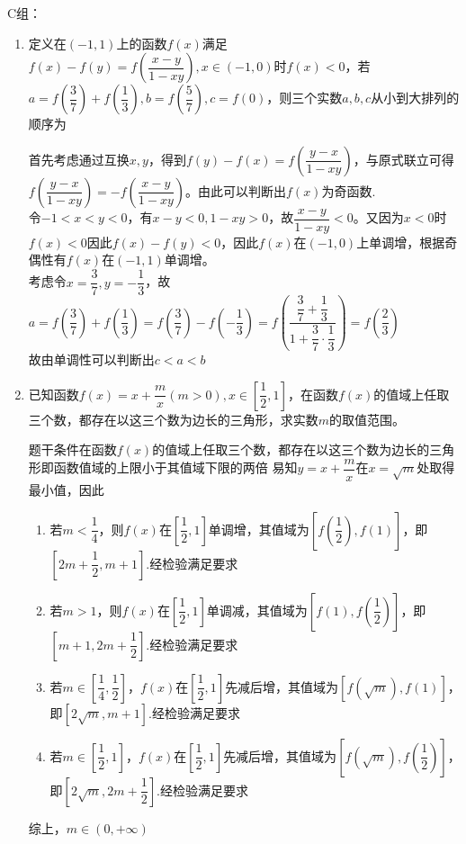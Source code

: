 C组：
\begin{enumerate}
    \item 定义在$(-1, 1)$上的函数$f(x)$满足$f(x) - f(y) = f(\dfrac{x-y}{1-xy}), x \in (-1, 0)$时$f(x) < 0$，若$a = f(\dfrac{3}{7}) + f(\dfrac{1}{3}), b = f(\dfrac{5}{7}), c = f(0)$，则三个实数$a, b, c$从小到大排列的顺序为
    \begin{jieda}
        首先考虑通过互换$x, y$，得到$f(y) - f(x) = f(\dfrac{y-x}{1-xy})$，与原式联立可得$f(\dfrac{y-x}{1-xy}) = -f(\dfrac{x-y}{1-xy})$。由此可以判断出$f(x)$为奇函数. \\
        令$-1 < x < y < 0$，有$x - y < 0, 1-xy > 0$，故$\dfrac{x - y}{1-xy} < 0$。又因为$x < 0$时$f(x) < 0$因此$f(x) - f(y) < 0$，因此$f(x)$在$(-1, 0)$上单调增，根据奇偶性有$f(x)$在$(-1, 1)$单调增。\\
        考虑令$x = \dfrac{3}{7}, y = -\dfrac{1}{3}$，故$a = f(\dfrac{3}{7}) + f(\dfrac{1}{3}) = f(\dfrac{3}{7}) - f(-\dfrac{1}{3}) = f(\dfrac{\dfrac{3}{7} + \dfrac{1}{3}}{1 + \dfrac{3}{7}\cdot\dfrac{1}{3}}) = f(\dfrac{2}{3})$ \\
        故由单调性可以判断出$c < a < b$
    \end{jieda}
    \begin{vspace_}
       \vsp[4] 
    \end{vspace_}
    \item 已知函数$f(x) = x + \dfrac{m}{x} (m > 0), x \in [\dfrac{1}{2}, 1]$，在函数$f(x)$的值域上任取三个数，都存在以这三个数为边长的三角形，求实数$m$的取值范围。
    \begin{jieda}
        题干条件在函数$f(x)$的值域上任取三个数，都存在以这三个数为边长的三角形即函数值域的上限小于其值域下限的两倍
        易知$y = x + \dfrac{m}{x}$在$x = \sqrt{m}$处取得最小值，因此
        \begin{enumerate}
            \item 若$m < \dfrac{1}{4}$，则$f(x)$在$[\dfrac{1}{2}, 1]$单调增，其值域为$[f(\dfrac{1}{2}), f(1)]$，即$[2m+\dfrac{1}{2}, m+1]$.经检验满足要求
            \item 若$m > 1$，则$f(x)$在$[\dfrac{1}{2}, 1]$单调减，其值域为$[f(1), f(\dfrac{1}{2})]$，即$[m+1, 2m+\dfrac{1}{2}]$.经检验满足要求
            \item 若$m \in [\dfrac{1}{4}, \dfrac{1}{2}]$，$f(x)$在$[\dfrac{1}{2}, 1]$先减后增，其值域为$[f(\sqrt{m}), f(1)]$，即$[2\sqrt{m}, m+1]$.经检验满足要求
            \item 若$m \in [\dfrac{1}{2}, 1]$，$f(x)$在$[\dfrac{1}{2}, 1]$先减后增，其值域为$[f(\sqrt{m}), f(\dfrac{1}{2})]$，即$[2\sqrt{m}, 2m+\dfrac{1}{2}]$.经检验满足要求
        \end{enumerate}
        综上，$m \in (0, +\infty)$
    \end{jieda}
\end{enumerate}


